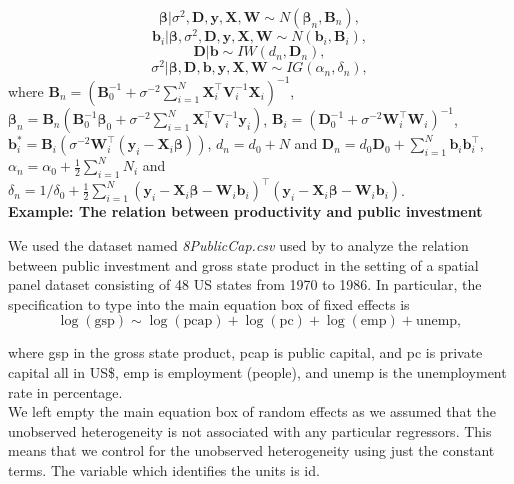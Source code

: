 \begin{equation*}
	\bm{\beta}|\sigma^2,\bm{D},\bm{y}, \bm{X}, \bm{W} \sim {N}(\bm{\beta}_n,\bm{B}_n), 
\end{equation*}
\begin{equation*}
	\bm{b}_i|\bm{\beta},\sigma^2,\bm{D},\bm{y}, \bm{X}, \bm{W} \sim {N}(\bm{b}_i,\bm{B}_i), 
\end{equation*}
\begin{equation*}
	\bm{D}| \bm{b} \sim {I}{W}(d_n, \bm{D}_n),
\end{equation*}
\begin{equation*}
	\sigma^2| \bm{\beta}, \bm{D}, \bm{b}, \bm{y}, \bm{X}, \bm{W} \sim {I}{G}(\alpha_n, \delta_n),
\end{equation*}
\noindent where $\bm{B}_n = (\bm{B}_0^{-1} +\sigma^{-2}\sum_{i=1}^N \bm{X}_i^{\top}\bm{V}_i^{-1}\bm{X}_i)^{-1}$, $\bm{\beta}_n= \bm{B}_n(\bm{B}_0^{-1}\bm{\beta}_0 +\sigma^{-2} \sum_{i=1}^N\bm{X}_i^{\top}\bm{V}_i^{-1}\bm{y}_i)$, $\bm{B}_i = (\bm{D}^{-1}_0 +\sigma^{-2} \bm{W}_i^{\top}\bm{W}_i)^{-1}$, $\bm{b}_i^*= \bm{B}_i(\sigma^{-2} \bm{W}_i^{\top}(\bm{y}_i-\bm{X}_i\bm{\beta}))$, $d_n = d_0 + N$ and $\bm{D}_n = d_0\bm{D}_0 + \sum_{i=1}^N \bm{b}_i\bm{b}_i^{\top}$, $\alpha_n=\alpha_0+\frac{1}{2}\sum_{i=1}^N N_i$ and $\delta_n=1/\delta_0+\frac{1}{2}\sum_{i=1}^N(\bm{y}_i-\bm{X}_i\bm{\beta}-\bm{W}_i\bm{b}_i)^{\top}(\bm{y}_i-\bm{X}_i\bm{\beta}-\bm{W}_i\bm{b}_i)$.\\ 

\textbf{Example: The relation between productivity and public investment}

We used the dataset named \textit{8PublicCap.csv} used by \cite{Ramirez2017} to analyze the relation  between public investment and gross state product in the setting of a spatial panel dataset consisting of 48 US states from 1970 to 1986.
In particular, the specification to type into the main equation box of fixed effects is
$$\log(\text{gsp})\sim\log(\text{pcap})+\log(\text{pc})+\log(\text{emp})+\text{unemp},$$

\noindent where gsp in the gross state product, pcap is public capital, and pc is private capital all in US\$, emp is employment (people), and unemp is the unemployment rate in percentage.\\

We left empty the main equation box of random effects as we assumed that the unobserved heterogeneity is not associated with any particular regressors.
This means that we control for the unobserved heterogeneity using just the constant terms.
The variable which identifies the units is id.\\

